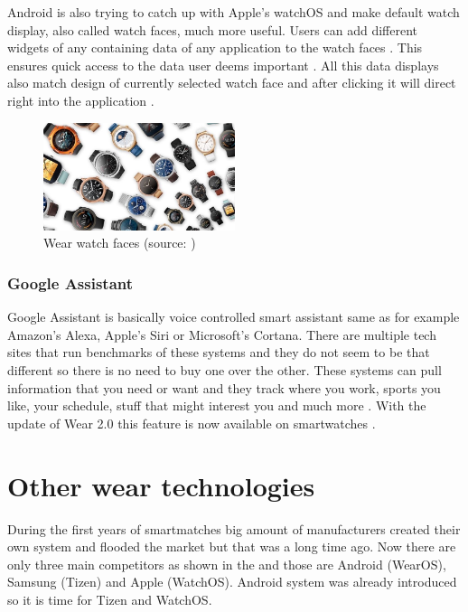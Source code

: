 Android is also trying to catch up with Apple's watchOS and make default watch display, also called watch faces, much more useful. Users can add different widgets of any containing data of any application to the watch faces \cite{AW2UG}. This ensures quick access to the data user deems important \cite{AW2N}. All this data displays also match design of currently selected watch face and after clicking it will direct right into the application \cite{AW2WN}.

\begin{figure}[H]
	\begin{centering}
		\includegraphics[width=0.5\textwidth]{img/wear_watch_faces}
		\par\end{centering}
	\caption{Wear watch faces (source: \cite{AW2UG})\label{fig:WearWatchFaces}}
	\label{fig04c04}
\end{figure}

\subsubsection{Google Assistant}\label{sec:GoogleAssistant}
Google Assistant is basically voice controlled smart assistant same as for example Amazon's Alexa, Apple's Siri or Microsoft's Cortana. There are multiple tech sites that run benchmarks of these systems \cite{ASGA, VACCGASAB, CAGACS, GASBAC} and they do not seem to be that different so there is no need to buy one over the other. These systems can pull information that you need or want and they track where you work, sports you like, your schedule, stuff that might interest you and much more \cite{WIGA}. With the update of Wear 2.0 this feature is now available on smartwatches \cite{AW2UG, AW2WN}.

\section{Other wear technologies}\label{sec:OtherWearTechnologies}
During the first years of smartmatches big amount of manufacturers created their own system and flooded the market but that was a long time ago. Now there are only three main competitors as shown in the  and those are Android (WearOS), Samsung (Tizen) and Apple (WatchOS). Android system was already introduced so it is time for Tizen and WatchOS.

